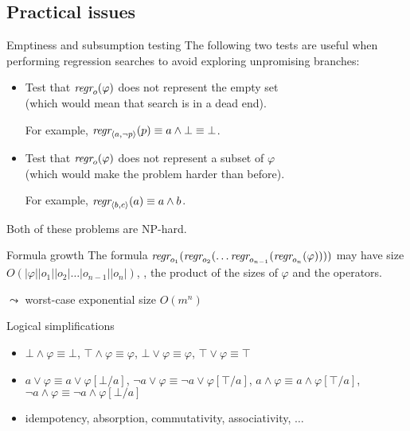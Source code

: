 \documentclass{gkibeamer}
\begin{document}
\subsection{Practical issues}

\begin{frame}{Emptiness and subsumption testing}
  The following two tests are useful when performing regression
  searches to avoid exploring unpromising branches:
  
  \begin{itemize}
  \item Test that $\textit{regr}_{o}(\varphi)$ does not represent the
    empty set \\ (which would mean that search is in a dead end).
    
    For example, $\textit{regr}_{\langle a, \neg p\rangle}(p)
    \equiv a \land \bot \equiv \bot$.
  \item Test that $\textit{regr}_{o}(\varphi)$ does not represent a subset of
    $\varphi$ \\
    (which would make the problem harder than before).

    For example, $\textit{regr}_{\langle b, c\rangle}(a) \equiv a \land b$.
  \end{itemize}

  Both of these problems are \alert{NP-hard}.
\end{frame}

\begin{frame}{Formula growth}
  The formula
  $\textit{regr}_{o_1}(\textit{regr}_{o_2}(\dots \textit{regr}_{o_{n-1}}(\textit{regr}_{o_n}(\varphi))))$
  may have size $O(|\varphi||o_1||o_2|\dots|o_{n-1}||o_n|)$, \ie,
  the product of the sizes of $\varphi$ and the operators.

  $\leadsto$ worst-case \alert{exponential} size $O(m^n)$

  \begin{block}{Logical simplifications}
    \begin{itemize}
    \item $\bot \land \varphi \equiv \bot$,
      $\top \land \varphi \equiv \varphi$,
      $\bot \lor \varphi \equiv\varphi$,
      $\top \lor \varphi \equiv\top$
    \item $a \lor \varphi \equiv a \lor \varphi[\bot/a]$,
      $\neg a \lor \varphi \equiv \neg a \lor \varphi[\top/a]$,
      $a \land \varphi \equiv a \land \varphi[\top/a]$,
      $\neg a \land \varphi \equiv \neg a \land \varphi[\bot/a]$
    \item idempotency, absorption, commutativity, associativity,
      $\dots$
    \end{itemize}
  \end{block}
\end{frame}
\end{document}
